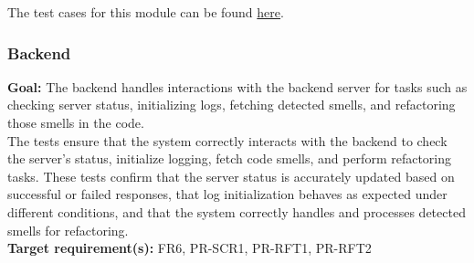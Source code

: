 \documentclass[12pt, titlepage]{article}
\begin{document}
  \noindent The test cases for this module can be found
  \href{https://github.com/ssm-lab/capstone--sco-vs-code-plugin/blob/plugin-multi-file/test/commands/wipeWorkCache.test.ts}{here}.

  \subsubsection{Backend}

  \textbf{Goal:} The backend handles interactions with the backend
  server for tasks such as checking server status, initializing logs,
  fetching detected smells, and refactoring those smells in the code.\\

  \noindent The tests ensure that the system correctly interacts with
  the backend to check the server's status, initialize logging, fetch
  code smells, and perform refactoring tasks. These tests confirm
  that the server status is accurately updated based on successful or
  failed responses, that log initialization behaves as expected under
  different conditions, and that the system correctly handles and
  processes detected smells for refactoring.\\

  \noindent \textbf{Target requirement(s):} FR6, PR-SCR1, PR-RFT1,
  PR-RFT2~\cite{SRS} \\
\end{document}
